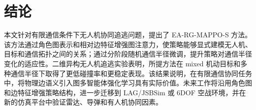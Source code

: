 \section{结论}

本文针对有限通信条件下无人机协同追逃问题，提出了 EA-RG-MAPPO-S 方法。该方法通过角色图表示和相对边特征增强图注意力，使策略能够显式建模无人机、目标和通信拓扑之间的关系；通过分阶段随机通信半径微调，提升策略对通信半径变化的适应性。二维异构无人机追逃实验表明，所提方法在 mixed 机动目标和多种通信半径下取得了更低碰撞率和更稳定表现。该结果说明，在有限通信协同任务中，将物理边语义引入图多智能体强化学习具有实际价值。未来工作将沿用角色图和边特征增强策略结构，进一步迁移到 LAG/JSBSim 或 6DOF 空战环境，并在新的仿真平台中验证雷达、导弹和有人机协同因素。
